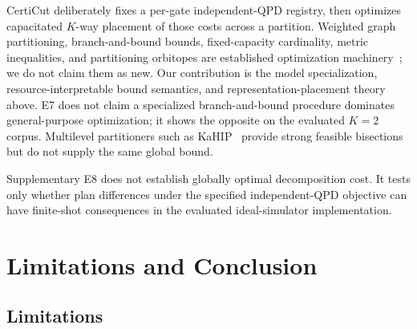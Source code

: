 \documentclass[11pt]{article}
\newcommand{\CertiCut}{CertiCut}
\newcommand{\CertiCut}{\textsc{CertiCut}}
\begin{document}
\CertiCut{} deliberately fixes a per-gate independent-QPD registry, then optimizes capacitated $K$-way placement of those costs across a partition. Weighted graph partitioning, branch-and-bound bounds, fixed-capacity cardinality, metric inequalities, and partitioning orbitopes are established optimization machinery~\cite{deza1997,lawler1966,kaibel2008}; we do not claim them as new. Our contribution is the model specialization, resource-interpretable bound semantics, and representation-placement theory above. E7 does not claim a specialized branch-and-bound procedure dominates general-purpose optimization; it shows the opposite on the evaluated $K=2$ corpus. Multilevel partitioners such as KaHIP~\cite{kahip} provide strong feasible bisections but do not supply the same global bound.

Supplementary E8 does not establish globally optimal decomposition cost. It tests only whether plan differences under the specified independent-QPD objective can have finite-shot consequences in the evaluated ideal-simulator implementation.

\section{Limitations and Conclusion}

\subsection{Limitations}
\end{document}
